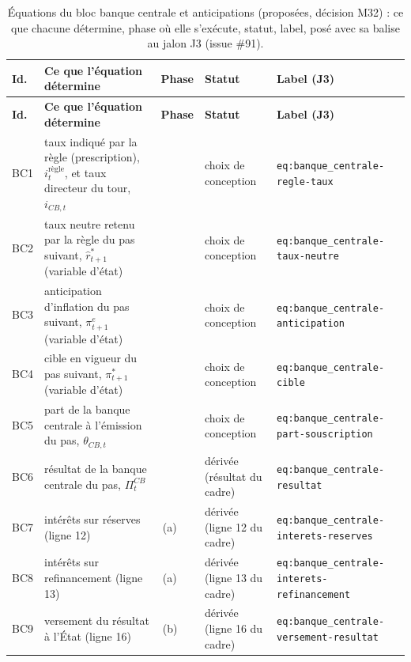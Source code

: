 \documentclass[11pt,a4paper]{article}
\begin{document}
\begin{center}\footnotesize
\setlength{\tabcolsep}{4pt}
\begin{longtable}{>{\raggedright\arraybackslash}p{0.8cm}>{\raggedright\arraybackslash}p{4.6cm}>{\raggedright\arraybackslash}p{1.4cm}>{\raggedright\arraybackslash}p{3.0cm}>{\raggedright\arraybackslash}p{4.9cm}}
\caption{Équations du bloc banque centrale et anticipations (proposées, décision M32) : ce que chacune détermine, phase où elle s'exécute, statut, label, posé avec sa balise au jalon J3 (issue \#91).}\label{tab:banque_centrale-equations}\\
\toprule
\textbf{Id.} & \textbf{Ce que l'équation détermine} & \textbf{Phase} & \textbf{Statut} & \textbf{Label (J3)}\\
\midrule
\endfirsthead
\toprule
\textbf{Id.} & \textbf{Ce que l'équation détermine} & \textbf{Phase} & \textbf{Statut} & \textbf{Label (J3)}\\
\midrule
\endhead
BC1 & taux indiqué par la règle (prescription), $i^{\text{règle}}_t$, et taux directeur du tour, $i_{\mathit{CB},t}$ & 1 & choix de conception & \texttt{eq:banque\_centrale-\allowbreak regle-taux}\\
BC2 & taux neutre retenu par la règle du pas suivant, $\hat r^\ast_{t+1}$ (variable d'état) & 1 & choix de conception & \texttt{eq:banque\_centrale-\allowbreak taux-neutre}\\
BC3 & anticipation d'inflation du pas suivant, $\pi^e_{t+1}$ (variable d'état) & 1 & choix de conception & \texttt{eq:banque\_centrale-\allowbreak anticipation}\\
BC4 & cible en vigueur du pas suivant, $\pi^\ast_{t+1}$ (variable d'état) & 1 & choix de conception & \texttt{eq:banque\_centrale-\allowbreak cible}\\
BC5 & part de la banque centrale à l'émission du pas, $\theta_{\mathit{CB},t}$ & 1 & choix de conception & \texttt{eq:banque\_centrale-\allowbreak part-souscription}\\
BC6 & résultat de la banque centrale du pas, $\Pi^{\mathit{CB}}_t$ & 1 & dérivée (résultat du cadre) & \texttt{eq:banque\_centrale-\allowbreak resultat}\\
BC7 & intérêts sur réserves (ligne 12) & 8\,(a) & dérivée (ligne 12 du cadre) & \texttt{eq:banque\_centrale-\allowbreak interets-reserves}\\
BC8 & intérêts sur refinancement (ligne 13) & 8\,(a) & dérivée (ligne 13 du cadre) & \texttt{eq:banque\_centrale-\allowbreak interets-refinancement}\\
BC9 & versement du résultat à l'État (ligne 16) & 8\,(b) & dérivée (ligne 16 du cadre) & \texttt{eq:banque\_centrale-\allowbreak versement-resultat}\\
\bottomrule
\end{longtable}
\end{center}
\end{document}
